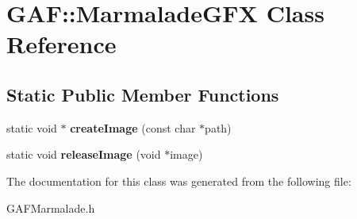 \hypertarget{class_g_a_f_1_1_marmalade_g_f_x}{\section{G\-A\-F\-:\-:Marmalade\-G\-F\-X Class Reference}
\label{class_g_a_f_1_1_marmalade_g_f_x}
}
\subsection*{Static Public Member Functions}
\begin{DoxyCompactItemize}
\item 
\hypertarget{class_g_a_f_1_1_marmalade_g_f_x_a88cf63d137d9592b4b21acf7554131f7}{static void $\ast$ {\bfseries create\-Image} (const char $\ast$path)}\label{class_g_a_f_1_1_marmalade_g_f_x_a88cf63d137d9592b4b21acf7554131f7}

\item 
\hypertarget{class_g_a_f_1_1_marmalade_g_f_x_aac1bf31913544820d1ede937c5ae63bd}{static void {\bfseries release\-Image} (void $\ast$image)}\label{class_g_a_f_1_1_marmalade_g_f_x_aac1bf31913544820d1ede937c5ae63bd}

\end{DoxyCompactItemize}


The documentation for this class was generated from the following file\-:\begin{DoxyCompactItemize}
\item 
G\-A\-F\-Marmalade.\-h\end{DoxyCompactItemize}
